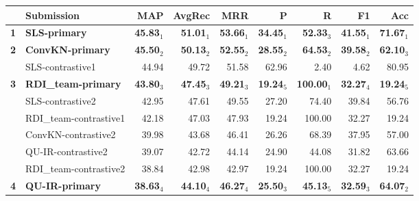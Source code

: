 \begin{table*}[tbh]
\begin{center}
\begin{tabular}{clrrrrrrr}
& \bf Submission & \bf MAP & \bf \scriptsize AvgRec & \bf \scriptsize MRR & \bf \scriptsize P & \bf \scriptsize R & \bf \scriptsize F1 & \bf \scriptsize Acc\\
\hline
\bf 1 & \bf SLS-primary & \bf 45.83$_{1}$ & \bf \scriptsize 51.01$_{1}$ & \bf \scriptsize 53.66$_{1}$ & \bf \scriptsize 34.45$_{1}$ & \bf \scriptsize 52.33$_{3}$ & \bf \scriptsize 41.55$_{1}$ & \bf \scriptsize 71.67$_{1}$ \\
\bf 2 & \bf ConvKN-primary & \bf 45.50$_{2}$ & \bf \scriptsize 50.13$_{2}$ & \bf \scriptsize 52.55$_{2}$ & \bf \scriptsize 28.55$_{2}$ & \bf \scriptsize 64.53$_{2}$ & \bf \scriptsize 39.58$_{2}$ & \bf \scriptsize 62.10$_{3}$ \\
& SLS-contrastive1 & 44.94 & \scriptsize 49.72 & \scriptsize 51.58 & \scriptsize 62.96 & \scriptsize  2.40 & \scriptsize  4.62 & \scriptsize 80.95 \\
\bf 3 & \bf RDI\_team-primary & \bf 43.80$_{3}$ & \bf \scriptsize 47.45$_{3}$ & \bf \scriptsize 49.21$_{3}$ & \bf \scriptsize 19.24$_{5}$ & \bf \scriptsize 100.00$_{1}$ & \bf \scriptsize 32.27$_{4}$ & \bf \scriptsize 19.24$_{5}$ \\
& SLS-contrastive2 & 42.95 & \scriptsize 47.61 & \scriptsize 49.55 & \scriptsize 27.20 & \scriptsize 74.40 & \scriptsize 39.84 & \scriptsize 56.76 \\
& RDI\_team-contrastive1 & 42.18 & \scriptsize 47.03 & \scriptsize 47.93 & \scriptsize 19.24 & \scriptsize 100.00 & \scriptsize 32.27 & \scriptsize 19.24 \\
& ConvKN-contrastive2 & 39.98 & \scriptsize 43.68 & \scriptsize 46.41 & \scriptsize 26.26 & \scriptsize 68.39 & \scriptsize 37.95 & \scriptsize 57.00 \\
& QU-IR-contrastive2 & 39.07 & \scriptsize 42.72 & \scriptsize 44.14 & \scriptsize 24.90 & \scriptsize 44.08 & \scriptsize 31.82 & \scriptsize 63.66 \\
& RDI\_team-contrastive2 & 38.84 & \scriptsize 42.98 & \scriptsize 42.97 & \scriptsize 19.24 & \scriptsize 100.00 & \scriptsize 32.27 & \scriptsize 19.24 \\
\bf 4 & \bf QU-IR-primary & \bf 38.63$_{4}$ & \bf \scriptsize 44.10$_{4}$ & \bf \scriptsize 46.27$_{4}$ & \bf \scriptsize 25.50$_{3}$ & \bf \scriptsize 45.13$_{5}$ & \bf \scriptsize 32.59$_{3}$ & \bf \scriptsize 64.07$_{2}$ \\

\end{tabular}
\end{center}
\end{table*}
